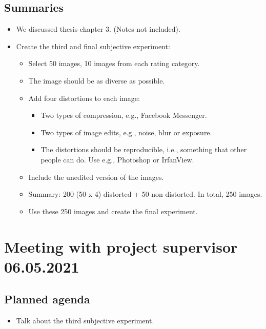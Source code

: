 \subsection*{Summaries}
\begin{itemize}
    \item We discussed thesis chapter 3. (Notes not included).
    \item Create the third and final subjective experiment:
    \begin{itemize}
        \item Select 50 images, 10 images from each rating category.
        \item The image should be as diverse as possible.
        \item Add four distortions to each image:
        \begin{itemize}
            \item Two types of compression, e.g., Facebook Messenger.
            \item Two types of image edits, e.g., noise, blur or exposure.
            \item The distortions should be reproducible, i.e., something that other people can do. Use e.g., Photoshop or IrfanView.
        \end{itemize}
    \item Include the unedited version of the images.
    \item Summary: 200 (50 x 4) distorted + 50 non-distorted. In total, 250 images.
    \item Use these 250 images and create the final experiment.
    \end{itemize}
\end{itemize}

\newpage

\section*{Meeting with project supervisor 06.05.2021}
\subsection*{Planned agenda}
\begin{itemize}
    \item Talk about the third subjective experiment.
\end{itemize}


